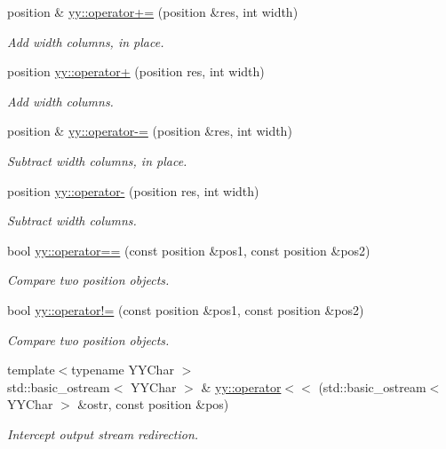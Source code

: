 \begin{DoxyCompactItemize}
\item 
position \& \hyperlink{namespaceyy_a211eb024d7e9666b07140040b079fccc}{yy\-::operator+=} (position \&res, int width)
\begin{DoxyCompactList}\small\item\em Add {\itshape width} columns, in place. \end{DoxyCompactList}\item 
position \hyperlink{namespaceyy_a23f0f414cfca1fd11ff2b779ba018038}{yy\-::operator+} (position res, int width)
\begin{DoxyCompactList}\small\item\em Add {\itshape width} columns. \end{DoxyCompactList}\item 
position \& \hyperlink{namespaceyy_a4cad44f80947f872e1bbf32fec9b7973}{yy\-::operator-\/=} (position \&res, int width)
\begin{DoxyCompactList}\small\item\em Subtract {\itshape width} columns, in place. \end{DoxyCompactList}\item 
position \hyperlink{namespaceyy_af6d37eb09001871194885eb8d31fef92}{yy\-::operator-\/} (position res, int width)
\begin{DoxyCompactList}\small\item\em Subtract {\itshape width} columns. \end{DoxyCompactList}\item 
bool \hyperlink{namespaceyy_a30a61b0569cd2c9ea4ae16eb4994c7b3}{yy\-::operator==} (const position \&pos1, const position \&pos2)
\begin{DoxyCompactList}\small\item\em Compare two position objects. \end{DoxyCompactList}\item 
bool \hyperlink{namespaceyy_abf91f5a379cf9f8c8be94f650c48c06c}{yy\-::operator!=} (const position \&pos1, const position \&pos2)
\begin{DoxyCompactList}\small\item\em Compare two position objects. \end{DoxyCompactList}\item 
{\footnotesize template$<$typename Y\-Y\-Char $>$ }\\std\-::basic\-\_\-ostream$<$ Y\-Y\-Char $>$ \& \hyperlink{namespaceyy_ac0f65a84b37cc3e7731a310eb240b952}{yy\-::operator$<$$<$} (std\-::basic\-\_\-ostream$<$ Y\-Y\-Char $>$ \&ostr, const position \&pos)
\begin{DoxyCompactList}\small\item\em Intercept output stream redirection. \end{DoxyCompactList}\end{DoxyCompactItemize}


